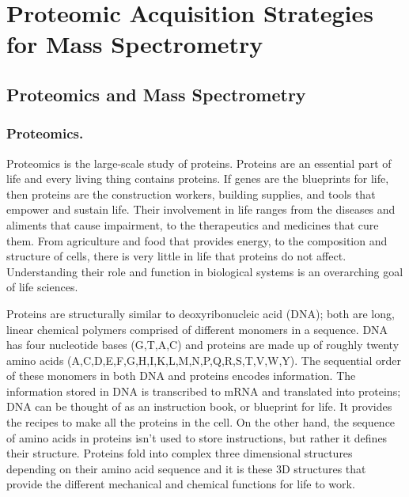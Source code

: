 \chapter{Proteomic Acquisition Strategies for Mass Spectrometry}

\section{Proteomics and Mass Spectrometry}

\subsection{Proteomics.}
Proteomics is the large-scale study of proteins. Proteins are an essential part of life and every living thing contains proteins. If genes are the blueprints for life, then proteins are the construction workers, building supplies, and tools that empower and sustain life. Their involvement in life ranges from the diseases and aliments that cause impairment, to the therapeutics and medicines that cure them. From agriculture and food that provides energy, to the composition and structure of cells, there is very little in life that proteins do not affect. Understanding their role and function in biological systems is an overarching goal of life sciences. 

Proteins are structurally similar to deoxyribonucleic acid (DNA); both are long, linear chemical polymers comprised of different monomers in a sequence. DNA has four nucleotide bases (G,T,A,C) and proteins are made up of roughly twenty amino acids (A,C,D,E,F,G,H,I,K,L,M,N,P,Q,R,S,T,V,W,Y). The sequential order of these monomers in both DNA and proteins encodes information. The information stored in DNA is transcribed to mRNA and translated into proteins; DNA can be thought of as an instruction book, or blueprint for life. It provides the recipes to make all the proteins in the cell. On the other hand, the sequence of amino acids in proteins isn't used to store instructions, but rather it defines their structure. Proteins fold into complex three dimensional structures depending on their amino acid sequence and it is these 3D structures that provide the different mechanical and chemical functions for life to work.

